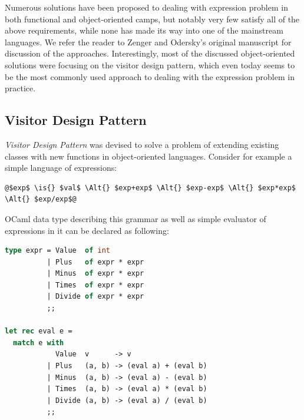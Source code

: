 \documentclass[preprint]{sigplanconf}
\newcommand{\Alt}{\ensuremath{|}}
\newcommand{\is}{$::=$}
\begin{document}
\noindent
Numerous solutions have been proposed to dealing with expression problem in both 
functional and object-oriented camps, but notably very few satisfy all of the 
above requirements, while none has made its way into one of the mainstream 
languages. We refer the reader to Zenger and Odersky's original  
manuscript for discussion of the approaches\cite{fool12}. Interestingly, most of 
the discussed object-oriented solutions were focusing on the visitor design 
pattern, which even today seems to be the most commonly used approach to dealing 
with the expression problem in practice.

\subsection{Visitor Design Pattern}
\label{sec:vdp}


\emph{Visitor Design Pattern}\cite{DesignPatterns1993} was devised to solve a problem 
of extending existing classes with new functions in object-oriented languages. 
Consider for example a simple language of expressions:

\begin{lstlisting}
@$exp$ \is{} $val$ \Alt{} $exp+exp$ \Alt{} $exp-exp$ \Alt{} $exp*exp$ \Alt{} $exp/exp$@
\end{lstlisting}

\noindent
OCaml data type describing this grammar as well as simple evaluator of expressions 
in it can be declared as following:

\begin{lstlisting}[language=Caml,keepspaces,columns=flexible]
type expr = Value  of int
          | Plus   of expr * expr
          | Minus  of expr * expr
          | Times  of expr * expr
          | Divide of expr * expr
          ;;

let rec eval e =
  match e with
            Value  v      -> v
          | Plus   (a, b) -> (eval a) + (eval b)
          | Minus  (a, b) -> (eval a) - (eval b)
          | Times  (a, b) -> (eval a) * (eval b)
          | Divide (a, b) -> (eval a) / (eval b)
          ;;
\end{lstlisting}
\end{document}
